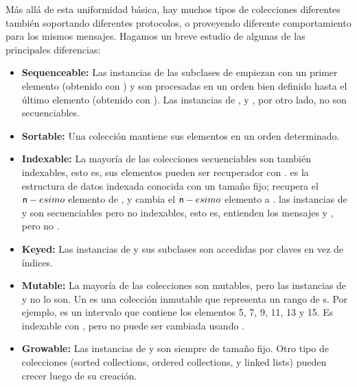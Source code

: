 \documentclass[a4paper,10pt,twoside]{book}
\begin{document}
M\'as all\'a de esta uniformidad b\'asica, hay muchos tipos de colecciones diferentes tambi\'en soportando diferentes protocolos, o proveyendo diferente comportamiento para los mismos mensajes.
Hagamos un breve estudio de algunas de las principales diferencias:

\begin{itemize}
  \item {\bf Sequenceable:}
  Las instancias de las subclases de  empiezan con un primer elemento (obtenido con ) y son procesadas en un orden bien definido hasta el \'ultimo elemento (obtenido con ).
  Las instancias de ,  y , por otro lado, no son secuenciables.

  \item {\bf Sortable:}
  Una colecci\'on  mantiene sus elementos en un orden determinado.

  \item {\bf Indexable:}
	La mayor\'ia de las colecciones secuenciables son tambi\'en indexables, esto es, sus elementos pueden ser recuperador con .
	 es la estructura de datos indexada conocida con un tama\~{n}o fijo;   recupera el $\mbox{\ct{n}}-esimo$ elemento de , y  cambia el $\mbox{\ct{n}}-esimo$ elemento a .
	las instancias de  y  son secuenciables pero no indexables, esto es, entienden los mensajes  y , pero no .

  \item {\bf Keyed:}
	Las instancias de  y sus subclases son accedidas por claves en vez de \'indices.

  \item {\bf Mutable:}
  La mayor\'ia de las colecciones son mutables, pero las instancias de  y  no lo son.
	Un  es una colecci\'on inmutable que representa un rango de s.  Por ejemplo,  es un intervalo que contiene los elementos 5, 7, 9, 11, 13 y 15. Es indexable con , pero no puede ser cambiada usando .

  \item {\bf Growable:}
  	Las instancias de  y  son siempre de tama\~{n}o fijo. Otro tipo de colecciones (sorted collections, ordered collections, y linked lists) pueden crecer luego de su creaci\'on.
	

\end{itemize}
\end{document}
